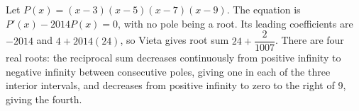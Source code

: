 Let $P(x)=(x-3)(x-5)(x-7)(x-9)$. The equation is $P\prime(x)-2014P(x)=0$, with no pole being a root. Its leading coefficients are $-2014$ and $4+2014(24)$, so Vieta gives root sum $\boxed{24+\dfrac{2}{1007}}$. There are four real roots: the reciprocal sum decreases continuously from positive infinity to negative infinity between consecutive poles, giving one in each of the three interior intervals, and decreases from positive infinity to zero to the right of 9, giving the fourth.
